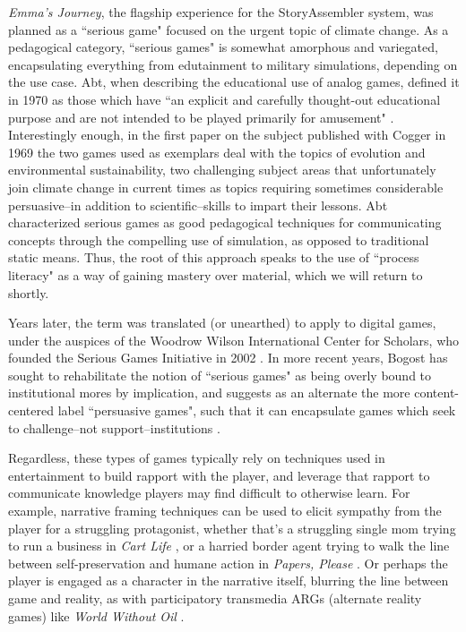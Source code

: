 \textit{Emma's Journey}, the flagship experience for the StoryAssembler system, was planned as a ``serious game" focused on the urgent topic of climate change. As a pedagogical category, ``serious games" is somewhat amorphous and variegated, encapsulating everything from edutainment to military simulations, depending on the use case. Abt, when describing the educational use of analog games, defined it in 1970 as those which have ``an explicit and carefully thought-out educational purpose and are not intended to be played primarily for amusement" \cite{abt1970serious}. Interestingly enough, in the first paper on the subject published with Cogger in 1969 \cite{Abt_Cogger_1969} the two games used as exemplars deal with the topics of evolution and environmental sustainability, two challenging subject areas that unfortunately join climate change in current times as topics requiring sometimes considerable persuasive--in addition to scientific--skills to impart their lessons. Abt characterized serious games as good pedagogical techniques for communicating concepts through the compelling use of simulation, as opposed to traditional static means. Thus, the root of this approach speaks to the use of ``process literacy" as a way of gaining mastery over material, which we will return to shortly.

Years later, the term was translated (or unearthed) to apply to digital games, under the auspices of the Woodrow Wilson International Center for Scholars, who founded the Serious Games Initiative in 2002 \cite{serious_games_init}. In more recent years, Bogost has sought to rehabilitate the notion of ``serious games" as being overly bound to institutional mores by implication, and suggests as an alternate the more content-centered label ``persuasive games", such that it can encapsulate games which seek to challenge--not support--institutions \cite{bogost2010persuasive}.

Regardless, these types of games typically rely on techniques used in entertainment to build rapport with the player, and leverage that rapport to communicate knowledge players may find difficult to otherwise learn. For example, narrative framing techniques can be used to elicit sympathy from the player for a struggling protagonist, whether that's a struggling single mom trying to run a business in \textit{Cart Life} \cite{hofmeier2011cart}, or a harried border agent trying to walk the line between self-preservation and humane action in \textit{Papers, Please} \cite{pope_2012}. Or perhaps the player is engaged as a character in the narrative itself, blurring the line between game and reality, as with participatory transmedia ARGs (alternate reality games) like \textit{World Without Oil} \cite{eklund_mcgonigal_2007}.


